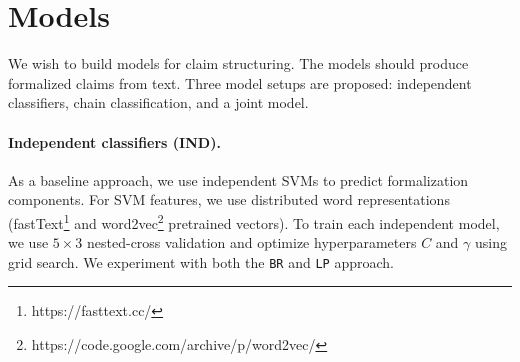 \section{Models}
\label{sec:claim_struc_models}

We wish to build models for claim structuring. The models should produce 
formalized claims from text. 
Three model setups are proposed: independent classifiers, 
chain classification, and a joint model. 

\paragraph{Independent classifiers (IND). }
As a baseline approach, we use independent SVMs to predict formalization
components.
For SVM features, we use distributed word representations
(fastText\footnote{https://fasttext.cc/}
and word2vec\footnote{https://code.google.com/archive/p/word2vec/}
pretrained vectors).
To train each independent model, we use $5 \times 3$ nested-cross validation
and optimize hyperparameters $C$ and $\gamma$ using grid search. 
We experiment with both the \texttt{BR} and \texttt{LP} approach.


